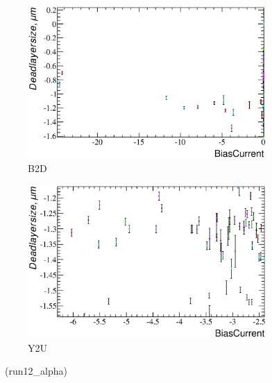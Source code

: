 \documentclass[a4paper,12pt]{article}
\begin{document}
\begin{figure}[htb]
\begin{subfigure}[t]{0.49\textwidth}
\includegraphics[width=\textwidth]{gfx/run12_alpha/B2D/c_hBiasCurrent_DeadLayerSize.eps}
\caption{B2D}
\end{subfigure}
%
\hfill
%
\begin{subfigure}[t]{0.49\textwidth}
\includegraphics[width=\textwidth]{gfx/run12_alpha/Y2U/c_hBiasCurrent_DeadLayerSize.eps}
\caption{Y2U}
\end{subfigure}
\caption{\bcvsxdllabel\ (run12\_alpha)}
\end{figure}
\end{document}

